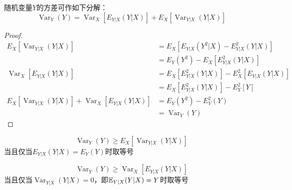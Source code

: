 \begin{theorem}[重方差公式]\label{thm:var_dec}
    随机变量$Y$的方差可作如下分解：
    \[ \operatorname{Var}_Y(Y)=\operatorname{Var}_X[E_{Y|X}(Y|X)] + E_X[\operatorname{Var}_{Y|X}(Y|X)] \]
\end{theorem}
\begin{proof}
    \begin{align*}
        E_X[\operatorname{Var}_{Y|X}(Y|X)]                                      & = E_X[E_{Y|X}(Y^2|X)-E^2_{Y|X}(Y|X)]        \\
                                                                                & = E_Y(Y^2) - E_X[E^2_{Y|X}(Y|X)]            \\
        \operatorname{Var}_X[E_{Y|X}(Y|X)]                                      & = E_X[E^2_{Y|X}(Y|X)] - E^2_X[E_{Y|X}(Y|X)] \\
                                                                                & = E_X[E^2_{Y|X}(Y|X)] - E^2_Y[Y]            \\
        E_X[\operatorname{Var}_{Y|X}(Y|X)] + \operatorname{Var}_X[E_{Y|X}(Y|X)] & = E_Y(Y^2) - E^2_Y(Y)                       \\
                                                                                & = \operatorname{Var}_Y(Y)
    \end{align*}
\end{proof}


\begin{corollary}
    \[ \operatorname{Var}_Y(Y) \ge E_X[\operatorname{Var}_{Y|X}(Y|X)] \]
    当且仅当$E_{Y|X}(Y|X)=E_Y(Y)$时取等号
\end{corollary}

\begin{corollary}
    \[ \operatorname{Var}_Y(Y) \ge \operatorname{Var}_X[E_{Y|X}(Y|X)] \]
    当且仅当$\operatorname{Var}_{Y|X}(Y|X)=0$，即$\mathbb{E}_{Y|X}(Y|X)=Y$时取等号
\end{corollary}

